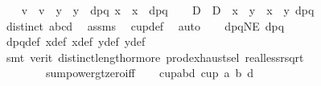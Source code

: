 \begin{isabellebody}
\ \ \isamarkupfalse%
\ v\ \ {\isachardoublequoteopen}v\ {\isasymequiv}\ {\isacharparenleft}{\kern0pt}{\isacharparenleft}{\kern0pt}y{}\ {\isacharminus}{\kern0pt}\ y{}{\isacharparenright}{\kern0pt}\ {\isacharslash}{\kern0pt}\ dpq{\isacharcomma}{\kern0pt}\ {\isacharparenleft}{\kern0pt}x{}\ {\isacharminus}{\kern0pt}\ x{}{\isacharparenright}{\kern0pt}\ {\isacharslash}{\kern0pt}\ dpq{\isacharparenright}{\kern0pt}{\isachardoublequoteclose}\isanewline
\ \ \isamarkupfalse%
\ D\ \ {\isachardoublequoteopen}D\ {\isasymequiv}\ {\isacharparenleft}{\kern0pt}x{}\ {\isacharasterisk}{\kern0pt}\ y{}\ {\isacharminus}{\kern0pt}\ x{}\ {\isacharasterisk}{\kern0pt}\ y{}{\isacharparenright}{\kern0pt}{\isacharslash}{\kern0pt}\ dpq{\isachardoublequoteclose}\isanewline
\ \ \isamarkupfalse%
\ {\isachardoublequoteopen}distinct\ {\isacharbrackleft}{\kern0pt}a{\isacharcomma}{\kern0pt}b{\isacharcomma}{\kern0pt}c{\isacharcomma}{\kern0pt}d{\isacharbrackright}{\kern0pt}{\isachardoublequoteclose}\ \isamarkupfalse%
\ assms\ \isamarkupfalse%
\ cup{\isacharunderscore}{\kern0pt}def\ \isamarkupfalse%
\ auto\isanewline
\ \ \isamarkupfalse%
\ dpqNE{}{\isacharcolon}{\kern0pt}\ {\isachardoublequoteopen}dpq\ {\isachargreater}{\kern0pt}\ {}{\isachardoublequoteclose}\ \isamarkupfalse%
\ dpq{\isacharunderscore}{\kern0pt}def\ x{}{\isacharunderscore}{\kern0pt}def\ x{}{\isacharunderscore}{\kern0pt}def\ y{}{\isacharunderscore}{\kern0pt}def\ y{}{\isacharunderscore}{\kern0pt}def\ \isanewline
\ \ \ \ \isamarkupfalse%
\ {\isacharparenleft}{\kern0pt}smt\ {\isacharparenleft}{\kern0pt}verit{\isacharparenright}{\kern0pt}\ distinct{\isacharunderscore}{\kern0pt}length{\isacharunderscore}{\kern0pt}{}{\isacharunderscore}{\kern0pt}or{\isacharunderscore}{\kern0pt}more\ prod{\isachardot}{\kern0pt}exhaust{\isacharunderscore}{\kern0pt}sel\ real{\isacharunderscore}{\kern0pt}less{\isacharunderscore}{\kern0pt}rsqrt\isanewline
\ \ \ \ \ \ \ \ sum{\isacharunderscore}{\kern0pt}power{}{\isacharunderscore}{\kern0pt}gt{\isacharunderscore}{\kern0pt}zero{\isacharunderscore}{\kern0pt}iff{\isacharparenright}{\kern0pt}\isanewline
\ \ \isamarkupfalse%
\ cup{\isacharunderscore}{\kern0pt}abd{\isacharcolon}{\kern0pt}\ {\isachardoublequoteopen}cup{}\ a\ b\ d{\isachardoublequoteclose}\ \isamarkupfalse%

\end{isabellebody}
